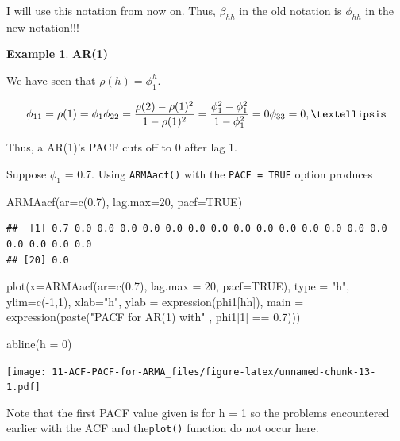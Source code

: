 \documentclass[
]{book}
\newenvironment{Shaded}{\begin{snugshade}}{\end{snugshade}}
\newcommand{\AttributeTok}[1]{\textcolor[rgb]{0.77,0.63,0.00}{#1}}
\newcommand{\ConstantTok}[1]{\textcolor[rgb]{0.00,0.00,0.00}{#1}}
\newcommand{\DecValTok}[1]{\textcolor[rgb]{0.00,0.00,0.81}{#1}}
\newcommand{\FloatTok}[1]{\textcolor[rgb]{0.00,0.00,0.81}{#1}}
\newcommand{\FunctionTok}[1]{\textcolor[rgb]{0.00,0.00,0.00}{#1}}
\newcommand{\NormalTok}[1]{#1}
\newcommand{\SpecialCharTok}[1]{\textcolor[rgb]{0.00,0.00,0.00}{#1}}
\newcommand{\StringTok}[1]{\textcolor[rgb]{0.31,0.60,0.02}{#1}}
\theoremstyle{definition}
\theoremstyle{definition}
\newtheorem{example}{Example}[chapter]
\theoremstyle{definition}
\theoremstyle{definition}
\theoremstyle{remark}
\begin{document}
I will use this notation from now on. Thus, \(\beta_{hh}\) in the old notation is \(\phi_{hh}\) in the new notation!!!

\begin{example}
\textbf{AR(1)}

We have seen that \(\rho(h) = \phi_1^h\).

\[\phi_{11} = \rho(1) = \phi_1\\
\phi_{22} = \frac{\rho(2)-\rho(1)^2}{1-\rho(1)^2} = \frac{\phi_1^2-\phi_1^2}{1-\phi_1^2} = 0\\
\phi_{33} = 0,…\]

Thus, a AR(1)'s PACF cuts off to 0 after lag 1.

Suppose \(\phi_1\) = 0.7. Using \texttt{ARMAacf()} with the \texttt{PACF\ =\ TRUE} option produces

\begin{Shaded}
\begin{Highlighting}[]
\FunctionTok{ARMAacf}\NormalTok{(}\AttributeTok{ar=}\FunctionTok{c}\NormalTok{(}\FloatTok{0.7}\NormalTok{), }\AttributeTok{lag.max=}\DecValTok{20}\NormalTok{, }\AttributeTok{pacf=}\ConstantTok{TRUE}\NormalTok{)}
\end{Highlighting}
\end{Shaded}

\begin{verbatim}
##  [1] 0.7 0.0 0.0 0.0 0.0 0.0 0.0 0.0 0.0 0.0 0.0 0.0 0.0 0.0 0.0 0.0 0.0 0.0 0.0
## [20] 0.0
\end{verbatim}

\begin{Shaded}
\begin{Highlighting}[]
\FunctionTok{plot}\NormalTok{(}\AttributeTok{x=}\FunctionTok{ARMAacf}\NormalTok{(}\AttributeTok{ar=}\FunctionTok{c}\NormalTok{(}\FloatTok{0.7}\NormalTok{), }\AttributeTok{lag.max =} \DecValTok{20}\NormalTok{, }\AttributeTok{pacf=}\ConstantTok{TRUE}\NormalTok{), }\AttributeTok{type =} \StringTok{"h"}\NormalTok{, }
     \AttributeTok{ylim=}\FunctionTok{c}\NormalTok{(}\SpecialCharTok{{-}}\DecValTok{1}\NormalTok{,}\DecValTok{1}\NormalTok{), }\AttributeTok{xlab=}\StringTok{"h"}\NormalTok{, }\AttributeTok{ylab =} \FunctionTok{expression}\NormalTok{(phi1[hh]), }\AttributeTok{main =} \FunctionTok{expression}\NormalTok{(}\FunctionTok{paste}\NormalTok{(}\StringTok{"PACF for AR(1) with"}\NormalTok{ , phi1[}\DecValTok{1}\NormalTok{] }\SpecialCharTok{==} \FloatTok{0.7}\NormalTok{)))}

\FunctionTok{abline}\NormalTok{(}\AttributeTok{h =} \DecValTok{0}\NormalTok{)}
\end{Highlighting}
\end{Shaded}

\texttt{[image: 11-ACF-PACF-for-ARMA\_files/figure-latex/unnamed-chunk-13-1.pdf]}

Note that the first PACF value given is for h = 1 so the problems encountered earlier with the ACF and the\texttt{plot()} function do not occur here.
\end{example}
\end{document}
